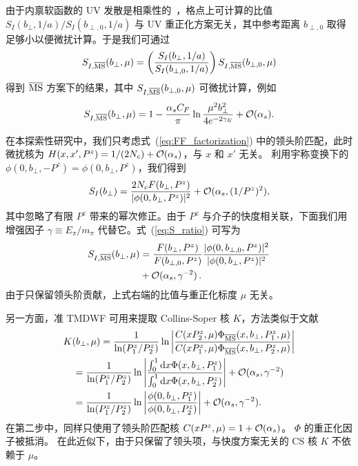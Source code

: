 由于内禀软函数的 UV 发散是相乘性的~\cite{Ji:2020ect}，格点上可计算的比值 $S_I(b_{\perp},1/a)/S_I(b_{\perp,0},1/a)$ 与 UV 重正化方案无关，其中参考距离 $b_{\perp,0}$ 取得足够小以便微扰计算。于是我们可通过
\begin{align}\label{eq:S_ratio}
S_{I,\overline{\rm MS}}(b_\perp,\mu)= \left(\frac{S_I(b_{\perp},1/a)}{S_I(b_{\perp,0},1/a)}\right)S_{I,\overline{\rm MS}}(b_{\perp,0},\mu)
\end{align}
得到 $\overline{\rm MS}$ 方案下的结果，其中 $S_{I,\overline{\rm MS}}(b_{\perp,0},\mu)$ 可微扰计算，例如
\begin{align}\label{eq:S_ratio_1loop}
S_{I,\overline{\rm MS}}(b_{{\perp}},\mu)=1-\frac{\alpha_sC_F}{\pi}\ln\frac{\mu^2 b_{{\perp}}^2}{4 e^{-2\gamma_E}}+{\cal O}(\alpha_s).
\end{align}

在本探索性研究中，我们只考虑式~(\ref{eq:FF_factorization}) 中的领头阶匹配，此时微扰核为 $H(x,x',P^z)=1/({2N_c})+{\cal O}(\alpha_s)$，与 $x$ 和 $x'$ 无关。
利用宇称变换下的 $\phi(0,b_\perp,-P^z)=\phi(0,b_\perp,P^z)$，我们得到
\begin{align}\label{eq:S_I_z=0}
S_I(b_\perp)=\frac{2N_c F(b_\perp,P^z)}{|\phi(0,b_\perp,P^z)|^2}+{\cal O}(\alpha_s, (1/P^z)^2),
\end{align}
其中忽略了有限 $P^z$ 带来的幂次修正。由于 $P^z$ 与介子的快度相关联，下面我们用增强因子 $\gamma\equiv E_{\pi}/m_{\pi}$ 代替它。式~(\ref{eq:S_ratio}) 可写为
\begin{align}\label{eq:S_ratio_z=0}
S_{I,\overline{\rm MS}}(b_\perp,\mu)&=\frac{F(b_\perp,P^z)}{F(b_{\perp,0},P^z)}\frac{|\phi(0,b_{\perp,0},P^z)|^2}{|\phi(0,b_\perp,P^z)|^2}\nonumber\\
&+{\cal O}(\alpha_s, \gamma^{-2})\, .
\end{align}
%
由于只保留领头阶贡献，上式右端的比值与重正化标度 $\mu$ 无关。

{另一方面，准 TMDWF} 可用来提取 Collins-Soper 核 $K$，方法类似于文献~\cite{Ebert:2018gzl}
\begin{align}
&K(b_\perp,\mu)=\frac{1}{\ln(P_1^z/P_2^z)}\ln\left|\frac{C(xP_2^z,\mu) \Phi_{\overline{\rm MS}}(x,b_\perp,P_1^z,\mu)}{C(xP_1^z,\mu) \Phi_{\overline{\rm MS}}(x,b_\perp,P_2^z,\mu)}\right|\label{eq:CS_kernel}\\
&\quad=\frac{1}{\ln(P_1^z/P_2^z)}\ln\left|\frac{\int_0^1 \textrm{d}x \Phi(x,b_\perp,P_1^z)}{\int_0^1 \textrm{d}x \Phi(x,b_\perp,P_2^z)}\right|+{\cal O}(\alpha_s, \gamma^{-2})\nonumber\\
&\quad=\frac{1}{\ln(P_1^z/P_2^z)}\ln\left|\frac{\phi(0,b_\perp,P_1^z)}{\phi(0,b_\perp,P_2^z)}\right|+{\cal O}(\alpha_s, \gamma^{-2})\label{eq:CS_kernel_z=0}.
\end{align}
%
{在第二步中，同样只使用了领头阶匹配核 $C(xP^z,\mu)=1+{\cal O}(\alpha_s)$。}
$\Phi$ 的重正化因子被抵消。
%
在此近似下，由于只保留了领头项，与快度方案无关的 CS 核 $K$ 不依赖于 $\mu$。

